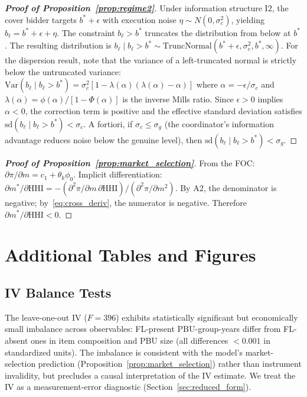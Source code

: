 \begin{proof}[\textbf{Proof of Proposition~\ref{prop:regime2}}]
Under information structure I2, the cover bidder targets
$b^* + \epsilon$ with execution noise $\eta \sim N(0, \sigma_c^2)$,
yielding $b_\ell = b^* + \epsilon + \eta$. The constraint
$b_\ell > b^*$ truncates the distribution from below at $b^*$.
The resulting distribution is
$b_\ell \mid b_\ell > b^* \sim
\text{TruncNormal}(b^* + \epsilon, \sigma_c^2, b^*, \infty)$.
For the dispersion result, note that the variance of a left-truncated
normal is strictly below the untruncated variance:
$\text{Var}(b_\ell \mid b_\ell > b^*) = \sigma_c^2[1 - \lambda(\alpha)
(\lambda(\alpha) - \alpha)]$ where $\alpha = -\epsilon/\sigma_c$
and $\lambda(\alpha) = \phi(\alpha)/[1 - \Phi(\alpha)]$ is the
inverse Mills ratio. Since $\epsilon > 0$ implies $\alpha < 0$,
the correction term is positive and the effective standard deviation
satisfies $\text{sd}(b_\ell \mid b_\ell > b^*) < \sigma_c$.
A fortiori, if $\sigma_c \leq \sigma_g$ (the coordinator's
information advantage reduces noise below the genuine level),
then $\text{sd}(b_\ell \mid b_\ell > b^*) < \sigma_g$.
\end{proof}

\begin{proof}[\textbf{Proof of Proposition~\ref{prop:market_selection}}]
From the FOC: $\partial \pi / \partial m = c_1 + \theta_k \phi_0$.
Implicit differentiation:
$\partial m^* / \partial \text{HHI} =
-(\partial^2 \pi / \partial m \, \partial \text{HHI}) /
(\partial^2 \pi / \partial m^2)$.
By A2, the denominator is negative; by~\eqref{eq:cross_deriv}, the
numerator is negative. Therefore $\partial m^* / \partial \text{HHI} < 0$.
\end{proof}


\section{Additional Tables and Figures}\label{app:robustness}

\subsection{IV Balance Tests}\label{app:iv_balance}
The leave-one-out IV ($F = 396$) exhibits statistically significant
but economically small imbalance across observables: FL-present
PBU-group-years differ from FL-absent ones in item composition
and PBU size (all differences $< 0.001$ in standardized units).
The imbalance is consistent with the model's market-selection
prediction (Proposition~\ref{prop:market_selection}) rather than
instrument invalidity, but precludes a causal interpretation of
the IV estimate. We treat the IV as a measurement-error diagnostic
(Section~\ref{sec:reduced_form}).

